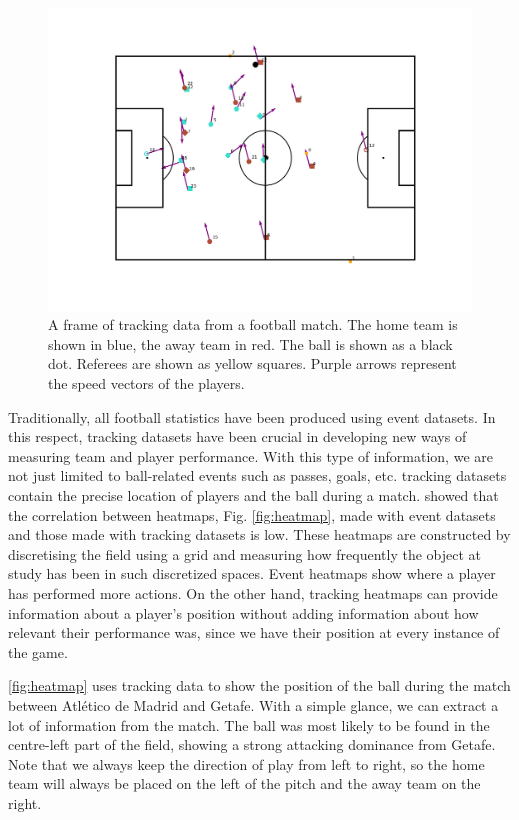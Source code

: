 \documentclass[
  10pt,
  twoside,nohyper]{book}
\begin{document}
\begin{figure}[H]

{\centering \includegraphics[width=0.8\linewidth,]{imagenes/Frame} 

}

\caption{A frame of tracking data from a football match. The home team is shown in blue, the away team in red. The ball is shown as a black dot. Referees are shown as yellow squares. Purple arrows represent the speed vectors of the players.}\label{fig:frame}
\end{figure}

Traditionally, all football statistics have been produced using event datasets. In this respect, tracking datasets have been crucial in developing new ways of measuring team and player performance. With this type of information, we are not just limited to ball-related events such as passes, goals, etc. tracking datasets contain the precise location of players and the ball during a match. \citep{GARRIDO2022112827} showed that the correlation between heatmaps, Fig. \ref{fig:heatmap}, made with event datasets and those made with tracking datasets is low. These heatmaps are constructed by discretising the field using a grid and measuring how frequently the object at study has been in such discretized spaces. Event heatmaps show where a player has performed more actions. On the other hand, tracking heatmaps can provide information about a player's position without adding information about how relevant their performance was, since we have their position at every instance of the game.

\ref{fig:heatmap} uses tracking data to show the position of the ball during the match between Atlético de Madrid and Getafe. With a simple glance, we can extract a lot of information from the match. The ball was most likely to be found in the centre-left part of the field, showing a strong attacking dominance from Getafe. Note that we always keep the direction of play from left to right, so the home team will always be placed on the left of the pitch and the away team on the right.
\end{document}
